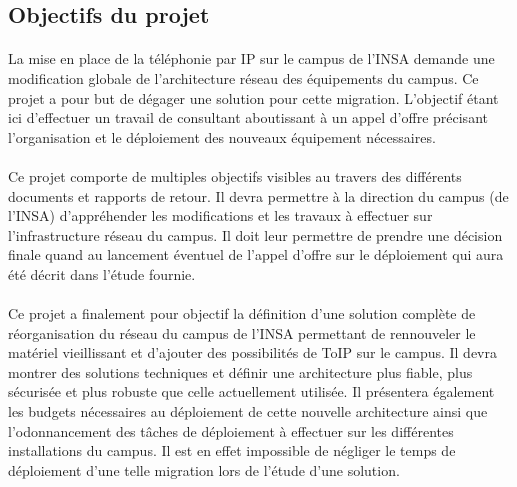 \subsection{Objectifs du projet}
\paragraph{} La mise en place de la téléphonie par IP sur le campus de l'INSA demande une modification globale de l'architecture réseau des équipements du campus. Ce projet a pour but de dégager une solution pour cette migration. L'objectif étant ici d'effectuer un travail de consultant aboutissant à un appel d'offre précisant l'organisation et le déploiement des nouveaux équipement nécessaires.
\paragraph{} Ce projet comporte de multiples objectifs visibles au travers des différents documents et rapports de retour. Il devra permettre à la direction du campus (de l'INSA) d'appréhender les modifications et les travaux à effectuer sur l'infrastructure réseau du campus. Il doit leur permettre de prendre une décision finale quand au lancement éventuel de l'appel d'offre sur le déploiement qui aura été décrit dans l'étude fournie.
\paragraph{} Ce projet a finalement pour objectif la définition d'une solution complète de réorganisation du réseau du campus de l'INSA permettant de rennouveler le matériel vieillissant et d'ajouter des possibilités de ToIP sur le campus. Il devra montrer des solutions techniques et définir une architecture plus fiable, plus sécurisée et plus robuste que celle actuellement utilisée. Il présentera également les budgets nécessaires au déploiement de cette nouvelle architecture ainsi que l'odonnancement des tâches de déploiement à effectuer sur les différentes installations du campus. Il est en effet impossible de négliger le temps de déploiement d'une telle migration lors de l'étude d'une solution.

